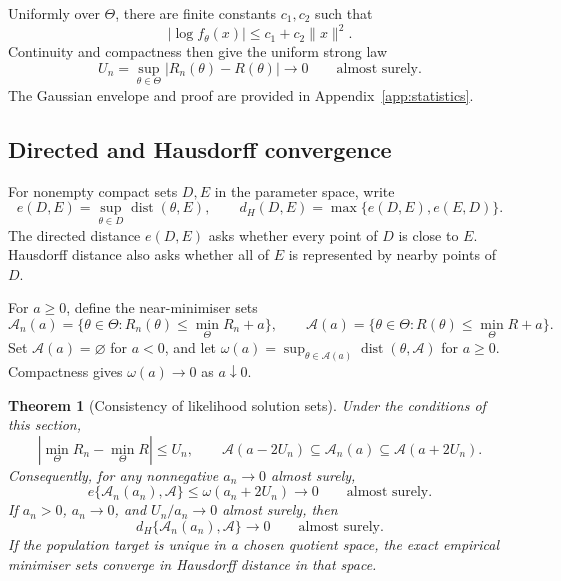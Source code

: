 \documentclass[12pt,a4paper]{article}
\newtheorem{theorem}{Theorem}[section]
\theoremstyle{remark}
\DeclareMathOperator{\dist}{dist}
\begin{document}
Uniformly over $\Theta$, there are finite constants $c_1,c_2$ such that
\[
 |\log f_\theta(x)|\le c_1+c_2\|x\|^2.
\]
Continuity and compactness then give the uniform strong law
\begin{equation}\label{eq:ULLN}
 U_n=\sup_{\theta\in\Theta}|R_n(\theta)-R(\theta)|
       \longrightarrow0\qquad\text{almost surely}.
\end{equation}
The Gaussian envelope and proof are provided in Appendix~\ref{app:statistics}.

\subsection{Directed and Hausdorff convergence}

For nonempty compact sets $D,E$ in the parameter space, write
\[
 e(D,E)=\sup_{\theta\in D}\dist(\theta,E),\qquad
 d_H(D,E)=\max\{e(D,E),e(E,D)\}.
\]
The directed distance $e(D,E)$ asks whether every point of $D$ is close to $E$. Hausdorff distance also asks whether all of $E$ is represented by nearby points of $D$.

For $a\ge0$, define the near-minimiser sets
\[
 \mathcal A_n(a)=\{\theta\in\Theta:
        R_n(\theta)\le\min_\Theta R_n+a\},\qquad
 \mathcal A(a)=\{\theta\in\Theta:
        R(\theta)\le\min_\Theta R+a\}.
\]
Set $\mathcal A(a)=\varnothing$ for $a<0$, and let
$\omega(a)=\sup_{\theta\in\mathcal A(a)}\dist(\theta,\mathcal A)$ for $a\ge0$.
Compactness gives $\omega(a)\to0$ as $a\downarrow0$.

\begin{theorem}[Consistency of likelihood solution sets]\label{thm:sets}
Under the conditions of this section,
\[
 \left|\min_\Theta R_n-\min_\Theta R\right|\le U_n,\qquad
 \mathcal A(a-2U_n)\subseteq\mathcal A_n(a)
                    \subseteq\mathcal A(a+2U_n).
\]
Consequently, for any nonnegative $a_n\to0$ almost surely,
\begin{equation}\label{eq:outer}
 e\{\mathcal A_n(a_n),\mathcal A\}
 \le\omega(a_n+2U_n)\longrightarrow0
 \qquad\text{almost surely}.
\end{equation}
If $a_n>0$, $a_n\to0$, and $U_n/a_n\to0$ almost surely, then
\begin{equation}\label{eq:hausdorff}
 d_H\{\mathcal A_n(a_n),\mathcal A\}\longrightarrow0
 \qquad\text{almost surely}.
\end{equation}
If the population target is unique in a chosen quotient space, the exact empirical minimiser sets converge in Hausdorff distance in that space.
\end{theorem}
\end{document}
